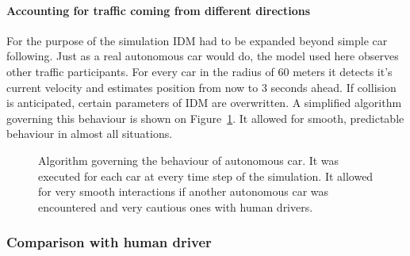 \documentclass[11pt,english]{article}
\begin{document}
\paragraph{Accounting for traffic coming from different directions} For the purpose of the simulation IDM had to be expanded beyond simple car following. Just as a real autonomous car would do, the model used here observes other traffic participants. For every car in the radius of 60 meters it detects it's current velocity and estimates position from now to 3 seconds ahead. 
If collision is anticipated, certain parameters of IDM are overwritten. A simplified algorithm governing this behaviour is shown on Figure~\ref{fig:idm_upgrade}. It allowed for smooth, predictable behaviour in almost all situations. 


\begin{figure}[!] %
\caption{Algorithm governing the behaviour of autonomous car. It was executed for each car at every time step of the simulation. It allowed for very smooth interactions if another autonomous car was encountered and very cautious ones with human drivers.}
\label{fig:idm_upgrade}
\end{figure} 

\subsubsection{Comparison with human driver}
\end{document}
